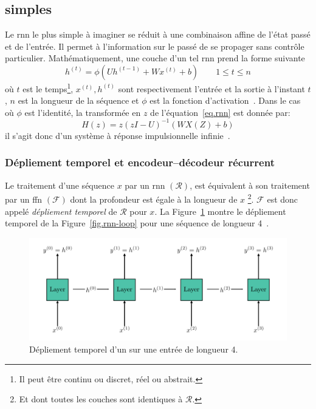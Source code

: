 \subsection{ simples}

Le \gls{rnn} le plus simple à imaginer se réduit à une combinaison affine de l'état passé et de l'entrée.
Il permet à l'information sur le passé de se propager sans contrôle particulier.
Mathématiquement, une couche d'un tel \gls{rnn} prend la forme suivante 
\begin{equation}
    \label{eq.rnn}
    h^{(t)} = \phi\left(Uh^{(t-1)} + Wx^{(t)} + b\right) \qquad 1 \le t \le n
\end{equation}
où \(t\) est le temps\footnote{Il peut être continu ou discret, réel ou abstrait.},
\(x^{(t)}, h^{(t)}\) sont respectivement l'entrée et la sortie à l'instant \(t\), 
\(n\) est la longueur de la séquence et \(\phi\) est la fonction d'activation~\cite{Fathi_2021}.
Dans le cas où \(\phi\) est l'identité,  
la transformée en \(z\) de l'équation~\ref{eq.rnn} est donnée par:
\begin{equation}
    \label{eq.rnn-tz}
    H(z) = z\left(zI - U\right)^{-1} \left(WX(Z) + b\right)
\end{equation}
il s'agit donc d'un système à réponse impulsionnelle infinie~\cite{Fathi_2021}.

\subsubsection{Dépliement temporel et encodeur--décodeur récurrent}

Le traitement d'une séquence \(x\) par un \gls{rnn} \((\mathcal{R})\), 
est équivalent à son traitement par un \gls{ffn} \((\mathcal{F})\) dont la profondeur est égale à la longueur de \(x\)%
\footnote{Et dont toutes les couches sont identiques à \(\mathcal{R}\).}.
\(\mathcal{F}\) est donc appelé \emph{dépliement temporel} de \(\mathcal{R}\) pour \(x\).
La Figure~\ref{fig.rnn-unfold} montre le dépliement temporel de la Figure~\ref{fig.rnn-loop} 
pour une séquence de longueur 4~\cite{LeCun_Bengio_Hinton_2015}.

\begin{figure}[hbt]
    \centering
    \includegraphics[width=\textwidth]{assets/images/rnn-unfolding.png}
    \caption{Dépliement temporel d'un  sur une entrée de longueur 4.}
    \label{fig.rnn-unfold}
\end{figure}

